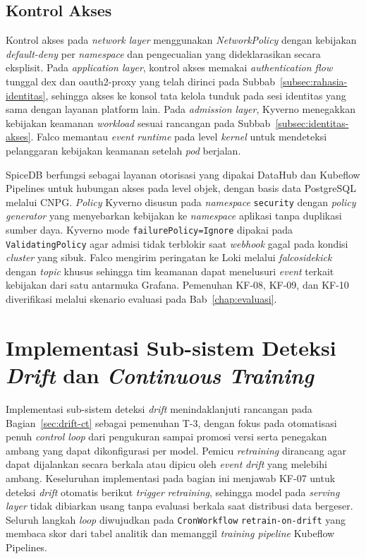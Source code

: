 \subsection{Kontrol Akses}
\label{subsec:impl-akses}

Kontrol akses pada \textit{network layer} menggunakan \textit{NetworkPolicy} dengan kebijakan \textit{default-deny} per \textit{namespace} dan pengecualian yang dideklarasikan secara eksplisit. Pada \textit{application layer}, kontrol akses memakai \textit{authentication flow} tunggal dex dan oauth2-proxy yang telah dirinci pada Subbab~\ref{subsec:rahasia-identitas}, sehingga akses ke konsol tata kelola tunduk pada sesi identitas yang sama dengan layanan platform lain. Pada \textit{admission layer}, Kyverno \autocite{kyverno2024} menegakkan kebijakan keamanan \textit{workload} sesuai rancangan pada Subbab~\ref{subsec:identitas-akses}. Falco \autocite{falco2025} memantau \textit{event} \textit{runtime} pada level \textit{kernel} untuk mendeteksi pelanggaran kebijakan keamanan setelah \textit{pod} berjalan.

SpiceDB \autocite{spicedb2025} berfungsi sebagai layanan otorisasi yang dipakai DataHub dan Kubeflow Pipelines untuk hubungan akses pada level objek, dengan basis data PostgreSQL melalui CNPG. \textit{Policy} Kyverno disusun pada \textit{namespace} \texttt{security} dengan \textit{policy generator} yang menyebarkan kebijakan ke \textit{namespace} aplikasi tanpa duplikasi sumber daya. Kyverno mode \texttt{failurePolicy=Ignore} dipakai pada \texttt{ValidatingPolicy} agar admisi tidak terblokir saat \textit{webhook} gagal pada kondisi \textit{cluster} yang sibuk. Falco mengirim peringatan ke Loki melalui \textit{falcosidekick} dengan \textit{topic} khusus sehingga tim keamanan dapat menelusuri \textit{event} terkait kebijakan dari satu antarmuka Grafana. Pemenuhan KF-08, KF-09, dan KF-10 diverifikasi melalui skenario evaluasi pada Bab~\ref{chap:evaluasi}.

\section{Implementasi Sub-sistem Deteksi \textit{Drift} dan \textit{Continuous Training}}
\label{sec:impl-drift}

Implementasi sub-sistem deteksi \textit{drift} menindaklanjuti rancangan pada Bagian~\ref{sec:drift-ct} sebagai pemenuhan T-3, dengan fokus pada otomatisasi penuh \textit{control loop} dari pengukuran sampai promosi versi serta penegakan ambang yang dapat dikonfigurasi per model. Pemicu \textit{retraining} dirancang agar dapat dijalankan secara berkala atau dipicu oleh \textit{event} \textit{drift} yang melebihi ambang. Keseluruhan implementasi pada bagian ini menjawab KF-07 untuk deteksi \textit{drift} otomatis berikut \textit{trigger} \textit{retraining}, sehingga model pada \textit{serving layer} tidak dibiarkan usang tanpa evaluasi berkala saat distribusi data bergeser. Seluruh langkah \textit{loop} diwujudkan pada \texttt{CronWorkflow} \texttt{retrain-on-drift} yang membaca skor dari tabel analitik dan memanggil \textit{training pipeline} Kubeflow Pipelines.

